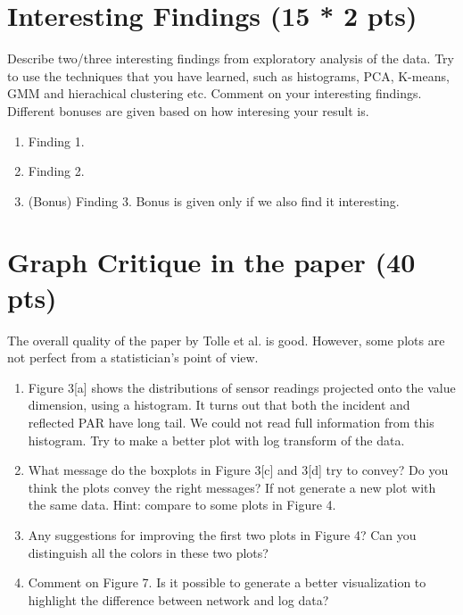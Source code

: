 \documentclass[11pt]{article}
\begin{document}
\section{Interesting Findings (15 * 2 pts)}
Describe two/three interesting findings from exploratory analysis of the data. Try to use the techniques that you have learned, such as histograms, PCA, K-means, GMM and hierachical clustering etc. Comment on your interesting findings. Different bonuses are given based on how interesing your result is. 
\begin{enumerate}[label=(\alph*)]
\item Finding 1.
\item Finding 2.
\item (Bonus) Finding 3. Bonus is given only if we also find it interesting. 
\end{enumerate}

\section{Graph Critique in the paper (40 pts)}
The overall quality of the paper by Tolle et al. is good. However, some plots are not perfect from a statistician's point of view.
\begin{enumerate}[label=(\alph*)]
\item Figure 3[a] shows the distributions of sensor readings projected onto the value dimension, using a histogram. It turns out that both the incident and reflected PAR have long tail. We could not read full information from this histogram. Try to make a better plot with log transform of the data. 
\item What message do the boxplots in Figure 3[c] and 3[d] try to convey? Do you think the plots convey the right messages? If not generate a new plot with the same data. Hint: compare to some plots in Figure 4.
\item Any suggestions for improving the first two plots in Figure 4? Can you distinguish all the colors in these two plots?
\item Comment on Figure 7. Is it possible to generate a better visualization to highlight the difference between network and log data?
\end{enumerate}
\end{document}
